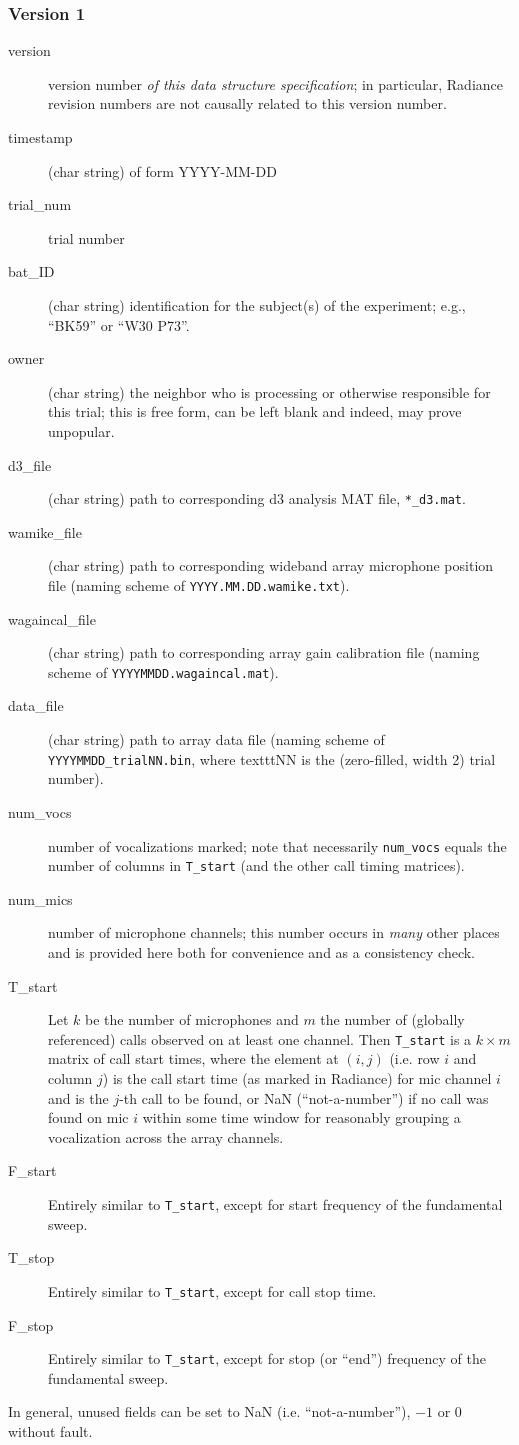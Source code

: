 \documentclass[letterpaper]{article}
\begin{document}
\subsubsection{Version 1}
\begin{description}
\item[version] version number \textit{of this data structure
  specification}; in particular, Radiance revision numbers are
  not causally related to this version number.
\item[timestamp] (char string) of form YYYY-MM-DD
\item[trial\_num] trial number
\item[bat\_ID] (char string) identification for the subject(s) of the
  experiment; e.g., ``BK59'' or ``W30 P73''.
\item[owner] (char string) the neighbor who is processing or otherwise
  responsible for this trial; this is free form, can be left blank and
  indeed, may prove unpopular.
\item[d3\_file] (char string) path to corresponding d3 analysis MAT
  file, \texttt{*\_d3.mat}.
\item[wamike\_file] (char string) path to corresponding wideband array
  microphone position file (naming scheme of
  \texttt{YYYY.MM.DD.wamike.txt}).
\item[wagaincal\_file] (char string) path to corresponding array gain
  calibration file (naming scheme of \texttt{YYYYMMDD.wagaincal.mat}).
\item[data\_file] (char string) path to array data file (naming scheme
  of \texttt{YYYYMMDD\_trialNN.bin}, where texttt{NN} is the
  (zero-filled, width 2) trial number).
\item[num\_vocs] number of vocalizations marked; note that necessarily
  \texttt{num\_vocs} equals the number of columns in
  \texttt{T\_start} (and the other call timing matrices).
\item[num\_mics] number of microphone channels; this number occurs in
  \textit{many} other places and is provided here both for convenience
  and as a consistency check.
\item[T\_start] Let $k$ be the number of microphones and $m$ the
  number of (globally referenced) calls observed on at least one
  channel. Then \texttt{T\_start} is a $k\times m$ matrix of call
  start times, where the element at $(i,j)$ (i.e. row $i$ and column
  $j$) is the call start time (as marked in Radiance) for mic channel
  $i$ and is the $j$-th call to be found, or NaN (``not-a-number'') if
  no call was found on mic $i$ within some time window for reasonably
  grouping a vocalization across the array channels.
\item[F\_start] Entirely similar to \texttt{T\_start}, except for
  start frequency of the fundamental sweep.
\item[T\_stop] Entirely similar to \texttt{T\_start}, except for call stop time.
\item[F\_stop] Entirely similar to \texttt{T\_start}, except for stop
  (or ``end'') frequency of the fundamental sweep.
\end{description}
In general, unused fields can be set to NaN (i.e. ``not-a-number''),
$-1$ or $0$ without fault.
\end{document}
